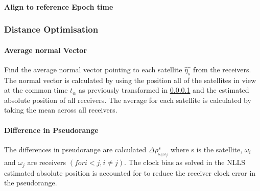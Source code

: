 \documentclass[11pt,a4paper]{article}
\begin{document}
\paragraph{Align to reference Epoch time}\label{timetransform}


\subsubsection{Distance Optimisation}
\paragraph{Average normal Vector}
Find the average normal vector pointing to each satellite $\hat{\eta_s}$ from the receivers. The normal vector is calculated by using the position all of the satellites in view at the common time $t_{\alpha}$ as previously transformed in \ref{timetransform} and the estimated absolute position of all receivers. The average for each satellite is calculated by taking the mean across all receivers.

\paragraph{Difference in Pseudorange}
The differences in pseudorange are calculated $\Delta\rho^s_{\omega_i\omega_j}$ where s is the satellite, $\omega_i$ and $\omega_j$ are receivers $(for i<j, i\neq j)$. The clock bias as solved in the NLLS estimated absolute position is accounted for to reduce the receiver clock error in the pseudorange.
\end{document}
